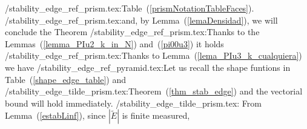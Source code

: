 /stability_edge_ref_prism.tex:Table~(\ref{prismNotationTableFaces}).
/stability_edge_ref_prism.tex:and, by Lemma~(\ref{lemaDensidad}), we will conclude the Theorem 
/stability_edge_ref_prism.tex:Thanks to the Lemmas~(\ref{lemma_PIu2_k_in_N}) and~(\ref{pi00u3}) it holds
/stability_edge_ref_prism.tex:Thanks to Lemma~(\ref{lema_PIu3_k_cualquiera}) we have 
/stability_edge_ref_pyramid.tex:Let us recall the shape funtions in Table~(\ref{shape_edge_table}) and
/stability_edge_tilde_prism.tex:Theorem~(\ref{thm_stab_edge}) and the vectorial bound will hold immediately.
/stability_edge_tilde_prism.tex:    \noindent From Lemma~(\ref{estabLinf}), since $|\tilde{E}|$ is finite measured,

